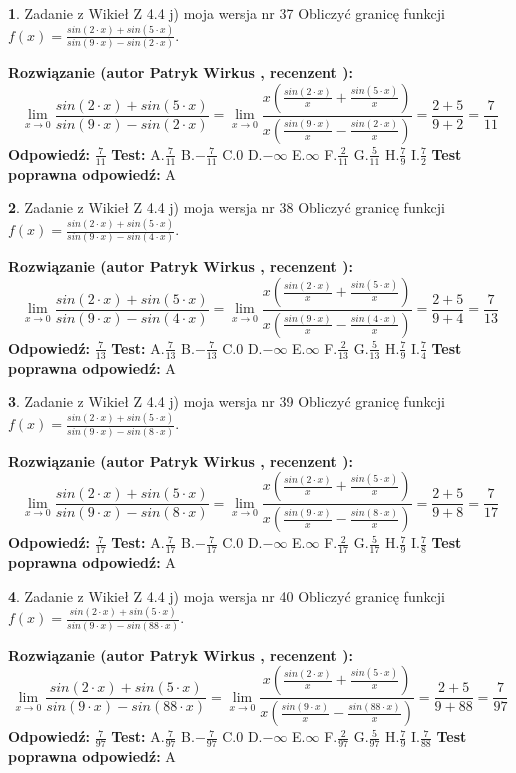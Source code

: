 \documentclass[12pt, a4paper]{article}
\theoremstyle{definition} %
\newtheorem{zad}{}
\newcommand{\zadStart}[1]{\begin{zad}#1\newline}
\newcommand{\zadStop}{\end{zad}}
\newcommand{\rozwStart}[2]{\noindent \textbf{Rozwiązanie (autor #1 , recenzent #2): }\newline}
\newcommand{\rozwStop}{\newline}
\newcommand{\odpStart}{\noindent \textbf{Odpowiedź:}\newline}
\newcommand{\odpStop}{\newline}
\newcommand{\testStart}{\noindent \textbf{Test:}\newline}
\newcommand{\testStop}{\newline}
\newcommand{\kluczStart}{\noindent \textbf{Test poprawna odpowiedź:}\newline}
\newcommand{\kluczStop}{\newline}
\begin{document}
\zadStart{Zadanie z Wikieł Z 4.4 j) moja wersja nr 37}
Obliczyć granicę funkcji $f(x)=\frac{sin(2\cdot x) +sin(5\cdot x)}{sin(9\cdot x) -sin(2\cdot x)}$.
\zadStop
\rozwStart{Patryk Wirkus}{}
$$\lim\limits_{x\to 0}\frac{sin(2\cdot x) +sin(5\cdot x)}{sin(9\cdot x) -sin(2\cdot x)}=\lim\limits_{x\to 0}\frac{x(\frac{sin(2\cdot x)}{x}+\frac{sin(5\cdot x)}{x})}{x(\frac{sin(9\cdot x)}{x}-\frac{sin(2\cdot x)}{x})}=\frac{2+5}{9+2} = \frac{7}{11}$$
\rozwStop
\odpStart
$\frac{7}{11}$
\odpStop
\testStart
A.$\frac{7}{11}$
B.$-\frac{7}{11}$
C.$0$
D.$-\infty$
E.$\infty$
F.$\frac{2}{11}$
G.$\frac{5}{11}$
H.$\frac{7}{9}$
I.$\frac{7}{2}$
\testStop
\kluczStart
A
\kluczStop



\zadStart{Zadanie z Wikieł Z 4.4 j) moja wersja nr 38}
Obliczyć granicę funkcji $f(x)=\frac{sin(2\cdot x) +sin(5\cdot x)}{sin(9\cdot x) -sin(4\cdot x)}$.
\zadStop
\rozwStart{Patryk Wirkus}{}
$$\lim\limits_{x\to 0}\frac{sin(2\cdot x) +sin(5\cdot x)}{sin(9\cdot x) -sin(4\cdot x)}=\lim\limits_{x\to 0}\frac{x(\frac{sin(2\cdot x)}{x}+\frac{sin(5\cdot x)}{x})}{x(\frac{sin(9\cdot x)}{x}-\frac{sin(4\cdot x)}{x})}=\frac{2+5}{9+4} = \frac{7}{13}$$
\rozwStop
\odpStart
$\frac{7}{13}$
\odpStop
\testStart
A.$\frac{7}{13}$
B.$-\frac{7}{13}$
C.$0$
D.$-\infty$
E.$\infty$
F.$\frac{2}{13}$
G.$\frac{5}{13}$
H.$\frac{7}{9}$
I.$\frac{7}{4}$
\testStop
\kluczStart
A
\kluczStop



\zadStart{Zadanie z Wikieł Z 4.4 j) moja wersja nr 39}
Obliczyć granicę funkcji $f(x)=\frac{sin(2\cdot x) +sin(5\cdot x)}{sin(9\cdot x) -sin(8\cdot x)}$.
\zadStop
\rozwStart{Patryk Wirkus}{}
$$\lim\limits_{x\to 0}\frac{sin(2\cdot x) +sin(5\cdot x)}{sin(9\cdot x) -sin(8\cdot x)}=\lim\limits_{x\to 0}\frac{x(\frac{sin(2\cdot x)}{x}+\frac{sin(5\cdot x)}{x})}{x(\frac{sin(9\cdot x)}{x}-\frac{sin(8\cdot x)}{x})}=\frac{2+5}{9+8} = \frac{7}{17}$$
\rozwStop
\odpStart
$\frac{7}{17}$
\odpStop
\testStart
A.$\frac{7}{17}$
B.$-\frac{7}{17}$
C.$0$
D.$-\infty$
E.$\infty$
F.$\frac{2}{17}$
G.$\frac{5}{17}$
H.$\frac{7}{9}$
I.$\frac{7}{8}$
\testStop
\kluczStart
A
\kluczStop



\zadStart{Zadanie z Wikieł Z 4.4 j) moja wersja nr 40}
Obliczyć granicę funkcji $f(x)=\frac{sin(2\cdot x) +sin(5\cdot x)}{sin(9\cdot x) -sin(88\cdot x)}$.
\zadStop
\rozwStart{Patryk Wirkus}{}
$$\lim\limits_{x\to 0}\frac{sin(2\cdot x) +sin(5\cdot x)}{sin(9\cdot x) -sin(88\cdot x)}=\lim\limits_{x\to 0}\frac{x(\frac{sin(2\cdot x)}{x}+\frac{sin(5\cdot x)}{x})}{x(\frac{sin(9\cdot x)}{x}-\frac{sin(88\cdot x)}{x})}=\frac{2+5}{9+88} = \frac{7}{97}$$
\rozwStop
\odpStart
$\frac{7}{97}$
\odpStop
\testStart
A.$\frac{7}{97}$
B.$-\frac{7}{97}$
C.$0$
D.$-\infty$
E.$\infty$
F.$\frac{2}{97}$
G.$\frac{5}{97}$
H.$\frac{7}{9}$
I.$\frac{7}{88}$
\testStop
\kluczStart
A
\kluczStop
\end{document}
